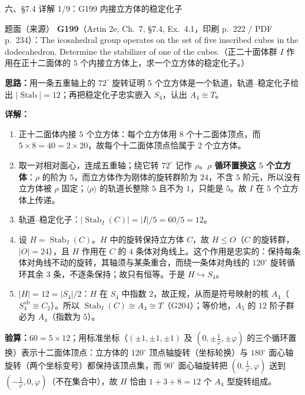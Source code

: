\documentclass[aspectratio=169,10pt,fontset=none]{ctexbeamer}
\newcommand{\ex}[1]{\textcolor{accent}{\footnotesize\bfseries #1}}
\newcommand{\key}[1]{\textcolor{ink}{\bfseries #1}}
\begin{document}
\begin{frame}[t]{六、\S7.4 详解 1/9：G199 内接立方体的稳定化子}
\label{ex:G199}
\scriptsize
\begin{block}{\footnotesize 题面（来源）}
\ex{G199}（Artin 2e, Ch.~7, \S7.4, Ex.~4.1，印刷 p.~222 / PDF p.~234）：The icosahedral group operates on the set of five inscribed cubes in the dodecahedron. Determine the stabilizer of one of the cubes.（正二十面体群 $I$ 作用在正十二面体的 $5$ 个内接立方体上，求一个立方体的稳定化子。）
\end{block}
\key{思路：}用一条五重轴上的 $72^\circ$ 旋转证明 $5$ 个立方体是一个轨道，轨道--稳定化子给出 $|\operatorname{Stab}|=12$；再把稳定化子忠实嵌入 $S_4$，认出 $A_4\cong T$。

\key{详解：}
\begin{enumerate}\setlength{\itemsep}{1pt}
\item 正十二面体内接 $5$ 个立方体：每个立方体用 $8$ 个十二面体顶点，而 $5\times8=40=2\times20$，故每个十二面体顶点恰属于 $2$ 个立方体。
\item 取一对相对面心，连成五重轴；绕它转 $72^\circ$ 记作 $\rho$。\textbf{$\rho$ 循环置换这 $5$ 个立方体}：$\rho$ 的阶为 $5$，而立方体作为刚体的旋转群阶为 $24$，不含 $5$ 阶元，所以没有立方体被 $\rho$ 固定；$\langle\rho\rangle$ 的轨道长整除 $5$ 且不为 $1$，只能是 $5$。故 $I$ 在 $5$ 个立方体上传递。
\item 轨道--稳定化子：$|\operatorname{Stab}_I(C)|=|I|/5=60/5=12$。
\item 设 $H=\operatorname{Stab}_I(C)$。$H$ 中的旋转保持立方体 $C$，故 $H\le O$（$C$ 的旋转群，$|O|=24$），且 $H$ 作用在 $C$ 的 $4$ 条体对角线上。这个作用是忠实的：保持每条体对角线不动的旋转，其轴须与某条重合，而绕一条体对角线的 $120^\circ$ 旋转循环其余 $3$ 条，不逐条保持；故只有恒等。于是 $H\hookrightarrow S_4$。
\item $|H|=12=|S_4|/2$：$H$ 在 $S_4$ 中指数 $2$，故正规，从而是符号映射的核 $A_4$（$S_4^{\mathrm{ab}}\cong C_2$）。所以 $\operatorname{Stab}_I(C)\cong A_4\cong T$（G204）；等价地，$A_5$ 的 $12$ 阶子群必为 $A_4$（指数为 $5$）。
\end{enumerate}
\key{验算：}$60=5\times12$；用标准坐标（$(\pm1,\pm1,\pm1)$ 及 $(0,\pm\frac1\varphi,\pm\varphi)$ 的三个循环置换）表示十二面体顶点：立方体的 $120^\circ$ 顶点轴旋转（坐标轮换）与 $180^\circ$ 面心轴旋转（两个坐标变号）都保持该顶点集，而 $90^\circ$ 面心轴旋转把 $(0,\frac1\varphi,\varphi)$ 送到 $(-\frac1\varphi,0,\varphi)$（不在集合中），故 $H$ 恰由 $1+3+8=12$ 个 $A_4$ 型旋转组成。
\end{frame}
\end{document}
